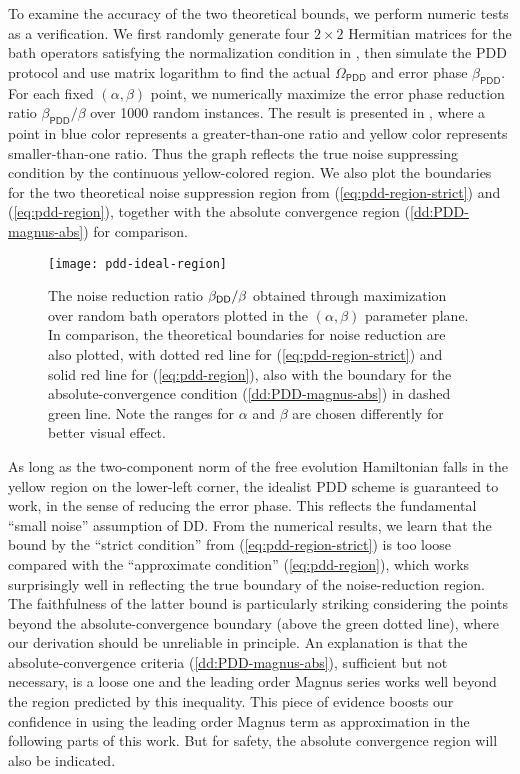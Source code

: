 \documentclass[twocolumn,pra,superscriptaddress]{revtex4-2}
\newcommand{\Opdd}{\Omega_{\mathsf{PDD}}}
\begin{document}
{To examine the accuracy of the two theoretical bounds, we perform numeric tests as a verification. We first randomly generate  four $2\times 2$ Hermitian matrices for the bath operators satisfying the normalization condition in , then simulate the PDD protocol and use matrix logarithm to find the actual $\Opdd$ and error phase $\beta_\mathsf{PDD}$.  For each fixed $(\alpha,\beta)$ point, we numerically maximize the error phase reduction ratio $\beta_\mathsf{PDD}/\beta$ over 1000 random instances. The result is presented in , where a point in blue color represents a greater-than-one ratio and  yellow color represents smaller-than-one ratio. Thus the graph reflects the true noise suppressing condition by the continuous yellow-colored region.
We also plot the boundaries for the two theoretical noise suppression region from (\ref{eq:pdd-region-strict}) and (\ref{eq:pdd-region}), together with the absolute convergence region (\ref{dd:PDD-magnus-abs}) for comparison. 

\begin{figure}
\texttt{[image: pdd-ideal-region]}
\caption{The noise reduction ratio $\beta_{\mathsf{DD}}/\beta$ obtained through maximization over random bath operators plotted in the $(\alpha,\beta)$ parameter plane. In comparison, the theoretical boundaries for noise reduction are also plotted, with dotted red line for (\ref{eq:pdd-region-strict}) and solid red line for (\ref{eq:pdd-region}), also with the boundary for the absolute-convergence condition (\ref{dd:PDD-magnus-abs}) in dashed green line. Note the ranges for $\alpha$ and $\beta$ are chosen differently for better visual effect.}
\label{fig:pdd-region}
\end{figure}

As long as the two-component norm of the free evolution Hamiltonian falls in the yellow region on the lower-left corner, the idealist PDD scheme is guaranteed to work, in the sense of reducing the error phase. This reflects the fundamental ``small noise'' assumption of DD. From the numerical results, we learn that the bound by the ``strict condition'' from (\ref{eq:pdd-region-strict}) is too loose compared with the ``approximate condition'' (\ref{eq:pdd-region}), which works surprisingly well in reflecting the true boundary of the noise-reduction region. The faithfulness of the latter bound is particularly striking considering the points beyond the absolute-convergence boundary (above the green dotted line), where our derivation should be unreliable in principle. An explanation is that the absolute-convergence criteria (\ref{dd:PDD-magnus-abs}), sufficient but not necessary, is a loose one and the leading order Magnus series works well beyond the region predicted by this inequality. This piece of evidence boosts our confidence in using the leading order Magnus term as approximation in the following parts of this work. But for safety, the absolute convergence region will also be indicated. 
}
\end{document}
